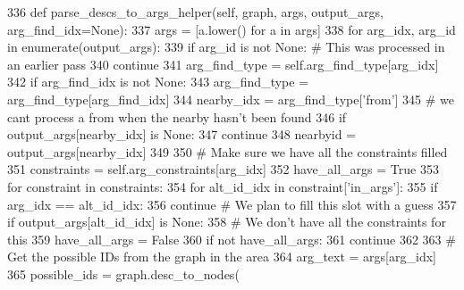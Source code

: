 \begin{DoxyCode}
336     \textcolor{keyword}{def }parse\_descs\_to\_args\_helper(self, graph, args, output\_args, arg\_find\_idx=None):
337         args = [a.lower() \textcolor{keywordflow}{for} a \textcolor{keywordflow}{in} args]
338         \textcolor{keywordflow}{for} arg\_idx, arg\_id \textcolor{keywordflow}{in} enumerate(output\_args):
339             \textcolor{keywordflow}{if} arg\_id \textcolor{keywordflow}{is} \textcolor{keywordflow}{not} \textcolor{keywordtype}{None}:  \textcolor{comment}{# This was processed in an earlier pass}
340                 \textcolor{keywordflow}{continue}
341             arg\_find\_type = self.arg\_find\_type[arg\_idx]
342             \textcolor{keywordflow}{if} arg\_find\_idx \textcolor{keywordflow}{is} \textcolor{keywordflow}{not} \textcolor{keywordtype}{None}:
343                 arg\_find\_type = arg\_find\_type[arg\_find\_idx]
344             nearby\_idx = arg\_find\_type[\textcolor{stringliteral}{'from'}]
345             \textcolor{comment}{# we cant process a from when the nearby hasn't been found}
346             \textcolor{keywordflow}{if} output\_args[nearby\_idx] \textcolor{keywordflow}{is} \textcolor{keywordtype}{None}:
347                 \textcolor{keywordflow}{continue}
348             nearbyid = output\_args[nearby\_idx]
349 
350             \textcolor{comment}{# Make sure we have all the constraints filled}
351             constraints = self.arg\_constraints[arg\_idx]
352             have\_all\_args = \textcolor{keyword}{True}
353             \textcolor{keywordflow}{for} constraint \textcolor{keywordflow}{in} constraints:
354                 \textcolor{keywordflow}{for} alt\_id\_idx \textcolor{keywordflow}{in} constraint[\textcolor{stringliteral}{'in\_args'}]:
355                     \textcolor{keywordflow}{if} arg\_idx == alt\_id\_idx:
356                         \textcolor{keywordflow}{continue}  \textcolor{comment}{# We plan to fill this slot with a guess}
357                     \textcolor{keywordflow}{if} output\_args[alt\_id\_idx] \textcolor{keywordflow}{is} \textcolor{keywordtype}{None}:
358                         \textcolor{comment}{# We don't have all the constraints for this}
359                         have\_all\_args = \textcolor{keyword}{False}
360             \textcolor{keywordflow}{if} \textcolor{keywordflow}{not} have\_all\_args:
361                 \textcolor{keywordflow}{continue}
362 
363             \textcolor{comment}{# Get the possible IDs from the graph in the area}
364             arg\_text = args[arg\_idx]
365             possible\_ids = graph.desc\_to\_nodes(

\end{DoxyCode}
